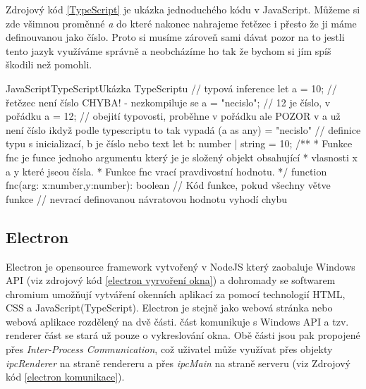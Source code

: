 \documentclass[
  biblatex,
  glossaries,
  index
]{kidiplom}
\begin{document}
Zdrojový kód \ref{TypeScript} je ukázka jednoduchého kódu v JavaScript. Můžeme
si zde všimnou proměnné \textit{a} do které nakonec nahrajeme řetězec i přesto že 
ji máme definouvanou jako číslo. Proto si musíme zároveň sami dávat pozor na to jestli
tento jazyk využíváme správně a neobcházíme ho tak že bychom si jím spíš škodili než pomohli.
\begin{kicode}{JavaScript}{TypeScript}{Ukázka TypeScriptu}
  // typová inference 
  let a = 10;
  // řetězec není číslo CHYBA! - nezkompiluje se
  a = "necislo";
  // 12 je číslo, v pořádku
  a = 12; 
  // obejití typovosti, proběhne v pořádku ale POZOR v a už není číslo ikdyž podle typescriptu to tak vypadá
  (a as any) = "necislo"
  // definice typu s inicializací, b je číslo nebo text
  let b: number | string = 10;
  /**
   * Funkce fnc je funce jednoho argumentu který je je složený objekt obsahující
   * vlasnosti x a y které jseou čísla.
   * Funkce fnc vrací pravdivostní hodnotu.
   */
  function fnc(arg: {x:number,y:number}): boolean {
      // Kód funkce, pokud všechny větve funkce 
      // nevrací definovanou návratovou hodnotu vyhodí chybu
  }

\end{kicode}

\subsection{Electron}
Electron je opensource framework vytvořený v NodeJS který 
zaobaluje Windows API (viz zdrojový kód \ref{electron vyrvoření okna}) a dohromady se softwarem chromium umožňují 
vytváření okenních aplikací za pomocí technologií HTML, CSS a JavaScript(TypeScript).
Electron je stejně jako webová stránka nebo webová aplikace rozdělený
na dvě části.  část komunikuje s Windows API a 
 tzv. renderer část se stará už pouze o vykreslování 
okna. Obě části jsou pak propojené přes \textit{Inter-Process Communication}, 
což uživatel může využívat přes objekty \textit{ipcRenderer} na straně rendereru
a přes \textit{ipcMain} na straně serveru (viz Zdrojový kód \ref{electron komunikace}).

\end{document}
